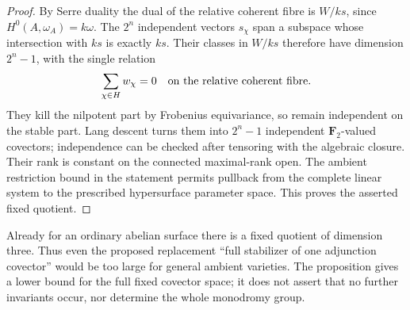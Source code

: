 \begin{proof}
By Serre duality the dual of the relative coherent
fibre is $W/k s$, since $H^0(A,\omega_A)=k\omega$.
The $2^n$ independent vectors $s_\chi$ span a subspace
whose intersection with $ks$ is exactly $ks$.
Their classes in $W/ks$ therefore have dimension
$2^n-1$, with the single relation
\begin{equation}\label{eq:abelian-covector-single-relation}
 \sum_{\chi\in H}w_\chi=0
       \quad\hbox{on the relative coherent fibre}.
\end{equation}
They kill the nilpotent part by Frobenius equivariance,
so remain independent on the stable part.  Lang descent
turns them into $2^n-1$ independent $\mathbf F_2$-valued
covectors; independence can be checked after tensoring
with the algebraic closure.  Their rank is constant on
the connected maximal-rank open.  The ambient restriction
bound in the statement permits pullback from the complete
linear system to the prescribed hypersurface parameter
space.  This proves the asserted fixed quotient.
\end{proof}

\begin{remark}\label{rem:abelian-obstruction-not-exact-group}
Already for an ordinary abelian surface there is a fixed
quotient of dimension three.  Thus even the proposed
replacement ``full stabilizer of one adjunction covector''
would be too large for general ambient varieties.
The proposition gives a lower bound for the full fixed
covector space; it does not assert that no further
invariants occur, nor determine the whole monodromy group.
\end{remark}

